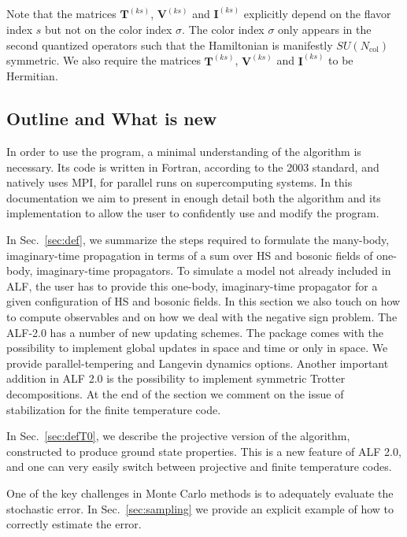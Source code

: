Note that the matrices  $\bm{T}^{(ks)}$,  $\bm{V}^{(ks)}$ and  $\bm{I}^{(ks)}$ explicitly depend on the flavor index $s$ but not on the color index $\sigma$. 
The color index $\sigma$ only appears in  the  second quantized operators such that the Hamiltonian is manifestly $SU(N_{\mathrm{col}})$    symmetric.  We also require
the matrices $\bm{T}^{(ks)}$,  $\bm{V}^{(ks)}$ and  $\bm{I}^{(ks)}$  to be  Hermitian. 

\subsection{Outline and What is new}


In order to use the program, a minimal understanding of the algorithm is necessary. 
Its code is written in Fortran, according to the 2003 standard, and natively uses MPI, for parallel runs on supercomputing systems.
In this documentation we aim to present in enough detail both the algorithm and its implementation to allow the user to confidently use and modify the program.

In Sec.~\ref{sec:def}, we summarize the steps required to formulate the many-body, imaginary-time propagation in terms of a sum over HS and bosonic fields of one-body, imaginary-time propagators.   
To simulate a model not already included in ALF, the user has to provide this one-body, imaginary-time propagator for a given configuration of HS and bosonic fields.  In this section we also  touch on how to compute observables and on  how we deal with the negative sign problem.  The ALF-2.0  has a number  of new updating schemes.   The package comes with  the possibility to  implement global updates in space and time or only in space. We provide parallel-tempering  and Langevin dynamics options.   Another important addition in ALF 2.0  is the possibility to implement symmetric Trotter decompositions.    At the end of the section   we  comment  on the issue of stabilization for the finite temperature code. 

In Sec.~\ref{sec:defT0},    we describe the projective version of the algorithm, constructed to produce ground state properties. This is a new feature of ALF 2.0, and  one can very easily switch between  projective and finite temperature codes. 

One of the key challenges in  Monte Carlo methods is to  adequately evaluate the stochastic error.  In Sec.~\ref{sec:sampling}  we provide an explicit example  of how to correctly estimate the   error. 

